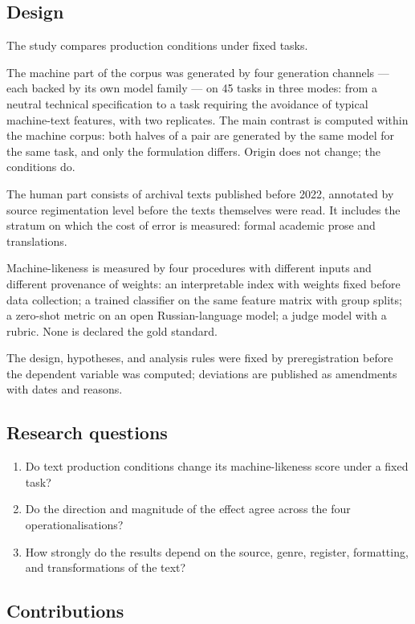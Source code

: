 \documentclass[11pt,a4paper]{article}
\renewcommand{\_}{\textunderscore\allowbreak}
\begin{document}
\subsection{Design}

The study compares production conditions under fixed tasks.

The machine part of the corpus was generated by four generation channels — each
backed by its own model family — on 45 tasks in three modes: from a neutral
technical specification to a task requiring the avoidance of typical
machine-text features, with two replicates. The main contrast is computed within the machine corpus: both
halves of a pair are generated by the same model for the same task, and only the
formulation differs. Origin does not change; the conditions do.

The human part consists of archival texts published before 2022, annotated by
source regimentation level before the texts themselves were read. It includes the
stratum on which the cost of error is measured: formal academic prose and translations.

Machine-likeness is measured by four procedures with different inputs and different
provenance of weights: an interpretable index with weights fixed before data
collection; a trained classifier on the same feature matrix with group splits; a
zero-shot metric on an open Russian-language model; a judge model with a rubric.
None is declared the gold standard.

The design, hypotheses, and analysis rules were fixed by preregistration before the
dependent variable was computed; deviations are published as amendments with dates
and reasons.

\subsection{Research questions}

\begin{enumerate}
\item[1.] Do text production conditions change its machine-likeness score under a fixed
   task?
\item[2.] Do the direction and magnitude of the effect agree across the four
   operationalisations?
\item[3.] How strongly do the results depend on the source, genre, register, formatting,
   and transformations of the text?
\end{enumerate}

\subsection{Contributions}
\end{document}

